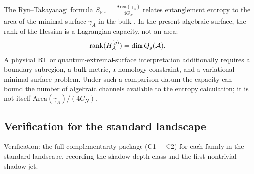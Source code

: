 \begin{remark}
The Ryu--Takayanagi formula
$S_{\mathrm{EE}} = \frac{\mathrm{Area}(\gamma_A)}{4G_N}$
relates entanglement entropy to the area of the minimal
surface $\gamma_A$ in the bulk \cite{Ryu-Takayanagi06}.  In the
present algebraic surface, the rank of the Hessian is a Lagrangian
capacity, not an area:
\[
\operatorname{rank}(H_{\mathcal{A}}^{(g)}) = \dim Q_g(\mathcal{A}).
\]
A physical RT or quantum-extremal-surface interpretation additionally
requires a boundary subregion, a bulk metric, a homology constraint,
and a variational minimal-surface problem.  Under such a comparison
datum the capacity can bound the number of algebraic channels
available to the entropy calculation; it is not itself
\(\mathrm{Area}(\gamma_A)/(4G_N)\).
\end{remark}

%
%

\subsection{Verification for the standard landscape}
\label{subsec:thqg-III-standard-landscape}

Verification: the full complementarity package (C1 + C2) for
each family in the standard landscape, recording the
shadow depth class and the first nontrivial shadow jet.

